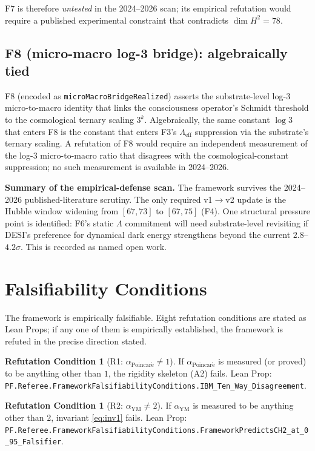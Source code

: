 \documentclass[11pt,a4paper]{article}
\theoremstyle{definition}
\newtheorem{refutation}[theorem]{Refutation Condition}
\theoremstyle{remark}
\newcommand{\Lambdaeff}{\Lambda_{\mathrm{eff}}}
\newcommand{\alphaYM}{\alpha_{\mathrm{YM}}}
\newcommand{\alphaP}{\alpha_{\mathrm{Poincar\acute{e}}}}
\newcommand{\lean}[1]{\texttt{\small #1}}
\begin{document}
F7 is therefore \emph{untested} in the 2024--2026 scan;
its empirical refutation would require a published
experimental constraint that contradicts $\dim H^{2} = 78$.

\subsection{F8 (micro-macro log-3 bridge): algebraically tied}
\label{sec:f8-tied}

F8 (encoded as \lean{microMacroBridgeRealized}) asserts the
substrate-level log-3 micro-to-macro identity that links the
consciousness operator's Schmidt threshold to the cosmological
ternary scaling $3^{k}$. Algebraically, the same constant
$\log 3$ that enters F8 is the constant that enters F3's
$\Lambdaeff$ suppression via the substrate's ternary scaling.
A refutation of F8 would require an independent measurement of
the log-3 micro-to-macro ratio that disagrees with the
cosmological-constant suppression; no such measurement is
available in 2024--2026.

\medskip
\noindent\textbf{Summary of the empirical-defense scan.} The
framework survives the 2024--2026 published-literature scrutiny.
The only required v1$\to$v2 update is the Hubble window widening
from $[67, 73]$ to $[67, 75]$ (F4). One structural pressure
point is identified: F6's static $\Lambda$ commitment will need
substrate-level revisiting if DESI's preference for dynamical
dark energy strengthens beyond the current $2.8$--$4.2\sigma$.
This is recorded as named open work.

\section{Falsifiability Conditions}
\label{sec:falsifiability}

The framework is empirically falsifiable. Eight refutation
conditions are stated as Lean Props; if any one of them is
empirically established, the framework is refuted in the precise
direction stated.

\begin{refutation}[R1: $\alphaP \ne 1$]
If $\alphaP$ is measured (or proved) to be anything other than
$1$, the rigidity skeleton (A2) fails. Lean Prop:
\lean{PF.Referee.FrameworkFalsifiabilityConditions.IBM\_Ten\_Way\_Disagreement}.
\end{refutation}

\begin{refutation}[R2: $\alphaYM \ne 2$]
If $\alphaYM$ is measured to be anything other than $2$, invariant
\eqref{eq:inv1} fails. Lean Prop:
\lean{PF.Referee.FrameworkFalsifiabilityConditions.FrameworkPredictsCH2\_at\_0\_95\_Falsifier}.
\end{refutation}
\end{document}
